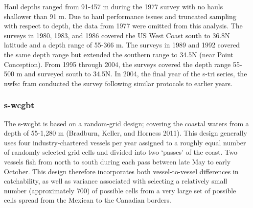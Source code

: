 \documentclass[11pt,
  english,
  a4paper,
]{article}
\begin{document}
\leavevmode\tagmcend\tagstructend\par


Haul depths ranged from 91-457 m during the 1977 survey with no hauls shallower than 91 m. Due to haul performance issues and truncated sampling with respect to depth, the data from 1977 were omitted from this analysis. The surveys in 1980, 1983, and 1986 covered the US West Coast south to 36.8\textdegree N latitude and a depth range of 55-366 m. The surveys in 1989 and 1992 covered the same depth range but extended the southern range to 34.5\textdegree N (near Point Conception). From 1995 through 2004, the surveys covered the depth range 55-500 m and surveyed south to 34.5\textdegree N. In 2004, the final year of the \gls{s-tri} series, the \gls{nwfsc} \gls{fram} conducted the survey following similar protocols to earlier years.

\leavevmode\tagmcend\tagstructend\par


\hypertarget{section-2}{%
\subsubsection{\texorpdfstring{\acrlong{s-wcgbt}}{}}\label{section-2}}

\leavevmode\tagmcend\tagstructend


The \Gls{s-wcgbt} is based on a random-grid design; covering the coastal waters from a depth of 55-1,280 m {(Bradburn, Keller, and Horness 2011)\leavevmode\tagmcend\tagstructend}. This design generally uses four industry-chartered vessels per year assigned to a roughly equal number of randomly selected grid cells and divided into two `passes' of the coast. Two vessels fish from north to south during each pass between late May to early October. This design therefore incorporates both vessel-to-vessel differences in catchability, as well as variance associated with selecting a relatively small number (approximately 700) of possible cells from a very large set of possible cells spread from the Mexican to the Canadian borders.

\leavevmode\tagmcend\tagstructend\par

\end{document}
